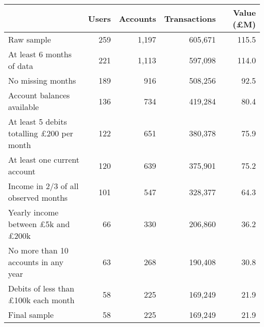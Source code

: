 \begin{tabular}{lrrrr}
\toprule
                                                 & Users & Accounts & Transactions & Value (\pounds M) \\
\midrule
                                      Raw sample &   259 &    1,197 &      605,671 &             115.5 \\
                       At least 6 months of data &   221 &    1,113 &      597,098 &             114.0 \\
                               No missing months &   189 &      916 &      508,256 &              92.5 \\
                      Account balances available &   136 &      734 &      419,284 &              80.4 \\
At least 5 debits totalling \pounds200 per month &   122 &      651 &      380,378 &              75.9 \\
                    At least one current account &   120 &      639 &      375,901 &              75.2 \\
            Income in 2/3 of all observed months &   101 &      547 &      328,377 &              64.3 \\
 Yearly income between \pounds5k and \pounds200k &    66 &      330 &      206,860 &              36.2 \\
            No more than 10 accounts in any year &    63 &      268 &      190,408 &              30.8 \\
      Debits of less than \pounds100k each month &    58 &      225 &      169,249 &              21.9 \\
                                    Final sample &    58 &      225 &      169,249 &              21.9 \\
\bottomrule
\end{tabular}
